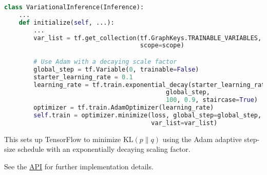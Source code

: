 \begin{lstlisting}[language=Python]
class VariationalInference(Inference):
    ...
    def initialize(self, ...):
        ...
        var_list = tf.get_collection(tf.GraphKeys.TRAINABLE_VARIABLES,
                                     scope=scope)

        # Use Adam with a decaying scale factor
        global_step = tf.Variable(0, trainable=False)
        starter_learning_rate = 0.1
        learning_rate = tf.train.exponential_decay(starter_learning_rate,
                                            global_step,
                                            100, 0.9, staircase=True)
        optimizer = tf.train.AdamOptimizer(learning_rate)
        self.train = optimizer.minimize(loss, global_step=global_step,
                                        var_list=var_list)
\end{lstlisting}

This sets up TensorFlow to minimize $\text{KL}(p\|q)$ using the Adam adaptive
step-size schedule with an exponentially decaying scaling factor.

See the \href{api/index.html}{API} for further implementation details.
